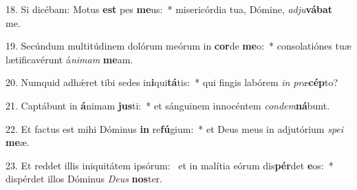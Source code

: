 18. Si dicébam: Motus \textbf{est} pes \textbf{me}us:~*  misericórdia tua, Dómine, \textit{ad}\textit{ju}\textbf{vá}\textbf{bat} me.\

19. Secúndum multitúdinem dolórum meórum in \textbf{cor}de \textbf{me}o:~*  consolatiónes tuæ lætificavérunt á\textit{ni}\textit{mam} \textbf{me}am.\

20. Numquid adhǽret tibi sedes in\textbf{i}qui\textbf{tá}tis:~*  qui fingis labórem \textit{in} \textit{præ}\textbf{cép}to?\

21. Captábunt in \textbf{á}nimam \textbf{jus}ti:~*  et sánguinem innocéntem \textit{con}\textit{dem}\textbf{ná}bunt.\

22. Et factus est mihi Dóminus \textbf{in} re\textbf{fú}gium:~*  et Deus meus in adjutórium \textit{spe}\textit{i} \textbf{me}æ.\

23. Et reddet illis iniquitátem ipsórum: \dag\  et in malítia eórum dis\textbf{pér}det \textbf{e}os:~*  dispérdet illos Dóminus \textit{De}\textit{us} \textbf{nos}ter.\

